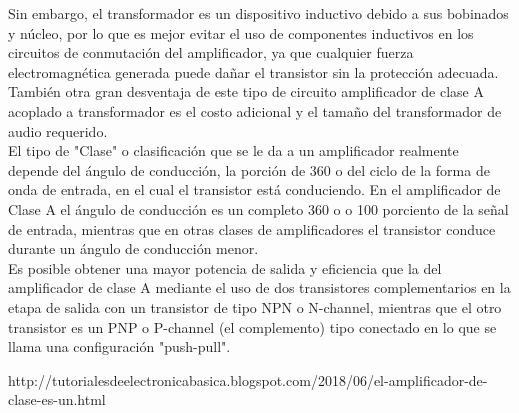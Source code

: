 \documentclass[10pt,a4paper]{article}
\begin{document}
Sin embargo, el transformador es un dispositivo inductivo debido a sus bobinados y núcleo, por lo que es mejor evitar el uso de componentes inductivos en los circuitos de conmutación del amplificador, ya que cualquier fuerza electromagnética generada puede dañar el transistor sin la protección adecuada.\\
También otra gran desventaja de este tipo de circuito amplificador de clase A acoplado a transformador es el costo adicional y el tamaño del transformador de audio requerido.\\
El tipo de "Clase" o clasificación que se le da a un amplificador realmente depende del ángulo de conducción, la porción de 360 o del ciclo de la forma de onda de entrada, en el cual el transistor está conduciendo. En el amplificador de Clase A el ángulo de conducción es un completo 360 o o 100 porciento de la señal de entrada, mientras que en otras clases de amplificadores el transistor conduce durante un ángulo de conducción menor.\\
Es posible obtener una mayor potencia de salida y eficiencia que la del amplificador de clase A mediante el uso de dos transistores complementarios en la etapa de salida con un transistor de tipo NPN o N-channel, mientras que el otro transistor es un PNP o P-channel (el complemento) tipo conectado en lo que se llama una configuración "push-pull".


{http://tutorialesdeelectronicabasica.blogspot.com/2018/06/el-amplificador-de-clase-es-un.html}

\end{document}
